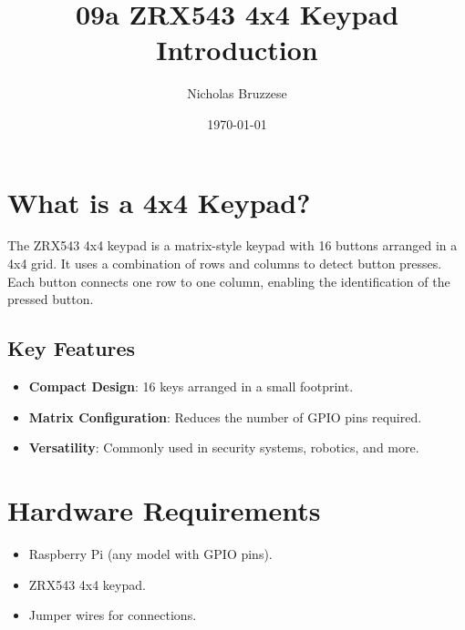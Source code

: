 \documentclass{article}
\title{09a ZRX543 4x4 Keypad Introduction}
\author{Nicholas Bruzzese}
\date{\today}
\begin{document}
	
	\maketitle
	
	\section*{What is a 4x4 Keypad?}
	The ZRX543 4x4 keypad is a matrix-style keypad with 16 buttons arranged in a 4x4 grid. It uses a combination of rows and columns to detect button presses. Each button connects one row to one column, enabling the identification of the pressed button.
	
	\subsection*{Key Features}
	\begin{itemize}
		\item \textbf{Compact Design}: 16 keys arranged in a small footprint.
		\item \textbf{Matrix Configuration}: Reduces the number of GPIO pins required.
		\item \textbf{Versatility}: Commonly used in security systems, robotics, and more.
	\end{itemize}
	
	\section*{Hardware Requirements}
	\begin{itemize}
		\item Raspberry Pi (any model with GPIO pins).
		\item ZRX543 4x4 keypad.
		\item Jumper wires for connections.
	\end{itemize}
	
\end{document}
